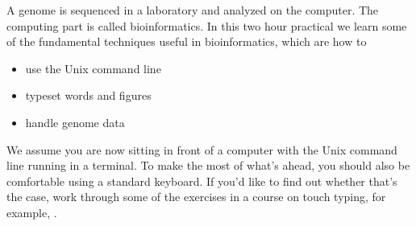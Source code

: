 A genome is sequenced in a laboratory and analyzed on the
computer. The computing part is called bioinformatics. In this two
hour practical we learn some of the fundamental techniques useful in
bioinformatics, which are how to 
\begin{itemize}
\item use the Unix command line
\item typeset words and figures
\item handle genome data
\end{itemize}
We assume you are now sitting in front of a computer with the Unix
command line running in a terminal. To make the most of what's ahead,
you should also be comfortable using a standard keyboard. If you'd
like to find out whether that's the case, work through some of the
exercises in a course on touch typing, for example, .
